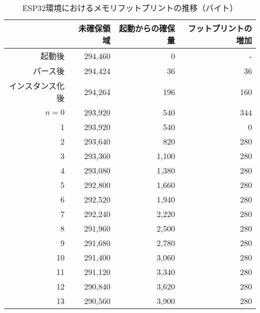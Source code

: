 \begin{table}[htbp]
  \caption{ESP32環境におけるメモリフットプリントの推移（バイト）}
  \label{tab:heap_size}
  \begin{center}
    \begin{tabular}{rrrr}
      \hline
      & 未確保領域 & 起動からの確保量 & フットプリントの増加 \\ \hline \hline
      起動後      & 294,460 & 0 & - \\ \hline
      パース後     & 294,424 & 36 & 36 \\ \hline
      インスタンス化後 & 294,264  & 196 & 160 \\ \hline
      $n=0$  & 293,920 &   540 & 344 \\ \hline
          1  & 293,920 &   540 &   0 \\ \hline
          2  & 293,640 &   820 & 280 \\ \hline
          3  & 293,360 & 1,100 & 280 \\ \hline
          4  & 293,080 & 1,380 & 280 \\ \hline
          5  & 292,800 & 1,660 & 280 \\ \hline
          6  & 292,520 & 1,940 & 280 \\ \hline
          7  & 292,240 & 2,220 & 280 \\ \hline
          8  & 291,960 & 2,500 & 280 \\ \hline
          9  & 291,680 & 2,780 & 280 \\ \hline
          10 & 291,400 & 3,060 & 280 \\ \hline
          11 & 291,120 & 3,340 & 280 \\ \hline
          12 & 290,840 & 3,620 & 280 \\ \hline
          13 & 290,560 & 3,900 & 280 \\ \hline
    \end{tabular}
  \end{center}
\end{table}
